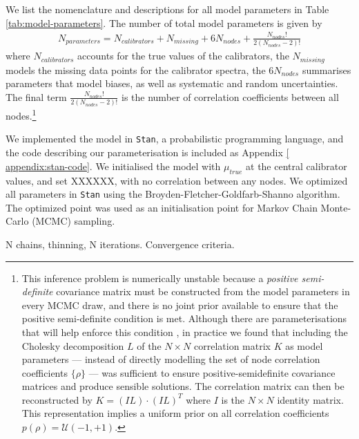 \documentclass[preprint]{aastex}
\begin{document}
We list the nomenclature and descriptions for all model parameters in Table 
\ref{tab:model-parameters}. The number of total model parameters is given by
\begin{eqnarray}
    N_{parameters} = N_{calibrators} + N_{missing} + 6N_{nodes} + \frac{N_{nodes}!}{2(N_{nodes} - 2)!}
\end{eqnarray}
where $N_{calibrators}$ accounts for the true values of the calibrators, the
$N_{missing}$ models the missing data points for the calibrator spectra, the
$6N_{nodes}$ summarises parameters that model biases, as well as systematic
and random uncertainties. The final term $\frac{N_{nodes}!}{2(N_{nodes} - 2)!}$
is the number of correlation coefficients between all nodes.\footnote{
This inference problem is numerically unstable because a \emph{positive semi-definite}
covariance matrix must be constructed from the model parameters in every MCMC draw, 
and there is no joint prior available to ensure that the positive semi-definite 
condition is met.  Although there are parameterisations that will help enforce 
this condition \citep{Pinheiro:1996}, in practice we found that including 
the Cholesky decomposition $L$ of the $N \times N$ correlation matrix $K$ as model
parameters --- instead of directly modelling the set of node correlation 
coefficients $\{\rho\}$ --- was sufficient to ensure positive-semidefinite 
covariance matrices and produce sensible solutions.  The correlation matrix can 
then be reconstructed by $K = (IL)\cdot(IL)^T$ where $I$ is the $N \times N$ identity
matrix.  This representation implies a uniform prior on all correlation coefficients
$p\left(\rho\right) = \mathcal{U}\left(-1, +1\right)$.}




We implemented the model in \texttt{Stan}, a probabilistic programming
language, and the code describing our parameterisation is included as Appendix \ref{
appendix:stan-code}. We initialised the model with $\mu_{true}$ at the central
calibrator values, and set XXXXXX, with no correlation between any nodes. We
optimized all parameters in \texttt{Stan} using the Broyden-Fletcher-Goldfarb-Shanno
algorithm. The optimized point was used as an initialisation point for Markov Chain
Monte-Carlo (MCMC) sampling.

N chains, thinning, N iterations. Convergence criteria.
 
 




\end{document}
